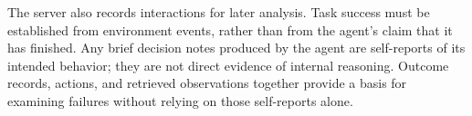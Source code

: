 The server also records interactions for later analysis. Task success must be established from environment events, rather than from the agent's claim that it has finished. Any brief decision notes produced by the agent are self-reports of its intended behavior; they are not direct evidence of internal reasoning. Outcome records, actions, and retrieved observations together provide a basis for examining failures without relying on those self-reports alone.

